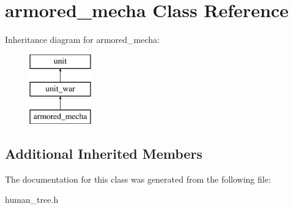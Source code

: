 \hypertarget{classarmored__mecha}{}\section{armored\+\_\+mecha Class Reference}
\label{classarmored__mecha}
Inheritance diagram for armored\+\_\+mecha\+:\begin{figure}[H]
\begin{center}
\leavevmode
\includegraphics[height=3.000000cm]{classarmored__mecha}
\end{center}
\end{figure}
\subsection*{Additional Inherited Members}


The documentation for this class was generated from the following file\+:\begin{DoxyCompactItemize}
\item 
human\+\_\+tree.\+h\end{DoxyCompactItemize}
